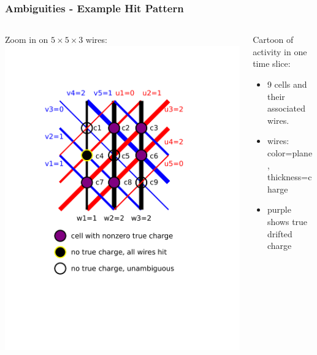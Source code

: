 \begin{frame}
  \frametitle{Ambiguities - Example Hit Pattern}

  \begin{columns}
    \begin{column}{0.35\textwidth}
      \begin{center}
        \scriptsize Zoom in on $5 \times 5 \times 3$ wires:
        \includegraphics[width=\textwidth,trim=3.5cm 6cm 5cm 3cm,clip]{example-hit-cells.pdf}        
      \end{center}
    \end{column}
    \begin{column}{0.65\textwidth}
      Cartoon of activity in one time slice:
      \begin{itemize}\footnotesize
      \item 9 cells and their associated wires.
      \item wires: color=plane, thickness=charge
      \item purple shows true drifted charge
      \end{itemize}


\end{column}
\end{columns}
\end{frame}
